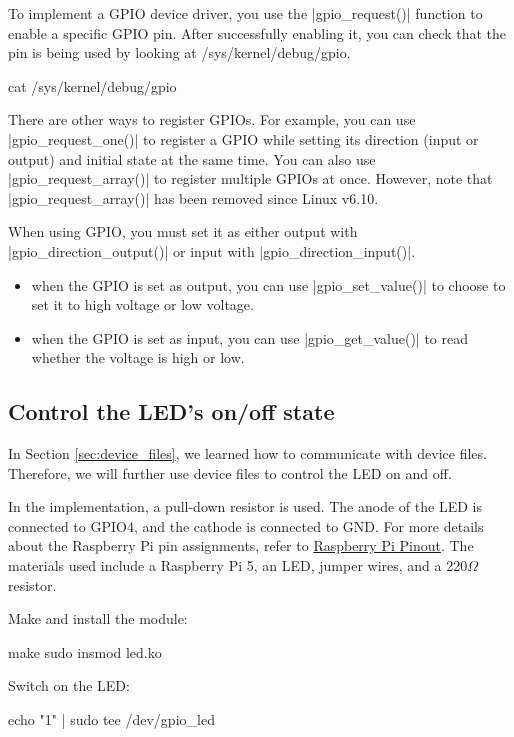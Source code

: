 \documentclass[10pt, oneside]{book}
\begin{document}
To implement a GPIO device driver, you use the \cpp|gpio_request()| function to enable a specific GPIO pin.
After successfully enabling it, you can check that the pin is being used by looking at /sys/kernel/debug/gpio.

\begin{codebash}
cat /sys/kernel/debug/gpio
\end{codebash}

There are other ways to register GPIOs.
For example, you can use \cpp|gpio_request_one()| to register a GPIO while setting its direction (input or output) and initial state at the same time.
You can also use \cpp|gpio_request_array()| to register multiple GPIOs at once. However, note that \cpp|gpio_request_array()| has been removed since Linux v6.10.

When using GPIO, you must set it as either output with \cpp|gpio_direction_output()| or input with \cpp|gpio_direction_input()|.

\begin{itemize}
  \item when the GPIO is set as output, you can use \cpp|gpio_set_value()| to choose to set it to high voltage or low voltage.
  \item when the GPIO is set as input, you can use \cpp|gpio_get_value()| to read whether the voltage is high or low.
\end{itemize}

\subsection{Control the LED's on/off state}
\label{sec:gpio_led}
In Section \ref{sec:device_files}, we learned how to communicate with device files.
Therefore, we will further use device files to control the LED on and off.

In the implementation, a pull-down resistor is used.
The anode of the LED is connected to GPIO4, and the cathode is connected to GND.
For more details about the Raspberry Pi pin assignments, refer to \href{https://pinout.xyz/}{Raspberry Pi Pinout}.
The materials used include a Raspberry Pi 5, an LED, jumper wires, and a 220$\Omega$ resistor.


Make and install the module:
\begin{codebash}
make
sudo insmod led.ko
\end{codebash}

Switch on the LED:
\begin{codebash}
echo "1" | sudo tee /dev/gpio_led
\end{codebash}
\end{document}
